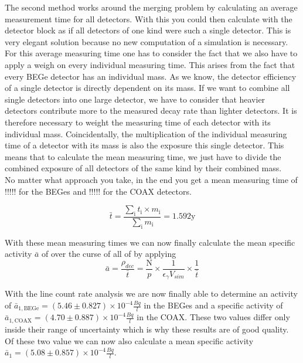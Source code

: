 \documentclass[encoding=utf8,british]{tumphthesis}
\begin{document}
The second method works around the merging problem by calculating an average measurement time for all detectors.
With this you could then calculate with the detector block as if all detectors of one kind were such a single detector.
This is very elegant solution because no new computation of a simulation is necessary.
\\

For this average measuring time one has to consider the fact that we also have to apply a weigh on every individual measuring time.
This arises from the fact that every BEGe detector has an individual mass.
As we know, the detector efficiency of a single detector is directly dependent on its mass.
If we want to combine all single detectors into one large detector, we have to consider that heavier detectors contribute more to the measured decay rate than lighter detectors.
It is therefore necessary to weight the measuring time of each detector with its individual mass.
Coincidentally, the multiplication of the individual measuring time of a detector with its mass is also the exposure this  single detector.
This means that to calculate the mean measuring time, we just have to divide the combined exposure of all detectors of the same kind by their combined mass.
\\

No matter what approach you take, in the end you get a mean measuring time of !!!!! for the BEGes and !!!!! for the COAX detectors.

\begin{equation*}
    \bar{t} = \frac{\sum_\mathrm{i} t_\mathrm{i} \times m_\mathrm{i}}{\sum_\mathrm{i} m_\mathrm{i}} = 1.592
    \mathrm{y}
\end{equation*}

With these mean measuring times we can now finally calculate the mean specific activity $\bar{a}$ of \Kr over the curse of all of \PII by applying
\begin{equation*}
    \bar{a} = \frac{\rho_{dec} }{\bar{t}} = \frac{\mathrm{N}}{p}\times\frac{1}{\epsilon_\gamma V_{sim}}\times\frac{1}{\bar{t}}
\end{equation*}


With the line count rate analysis we are now finally able to determine an activity of $\bar{a}_{\mathrm{1,BEGe}} = (5.46\pm0.827)\times10^{-4}	\frac{\unit{Bq}}{\unit{l}}$ in the BEGes and a specific activity of $\bar{a}_{\mathrm{1,COAX}} = (4.70\pm0.887)\times10^{-4}	\frac{\unit{Bq}}{\unit{l}}$ in the COAX.
These two values differ only inside their range of uncertainty which is why these results are of good quality.
Of these two value we can now also calculate a mean specific activity $\bar{a}_{1} = (5.08\pm0.857)\times10^{-4}\frac{\unit{Bq}}{\unit{l}}$.
\\
\end{document}
